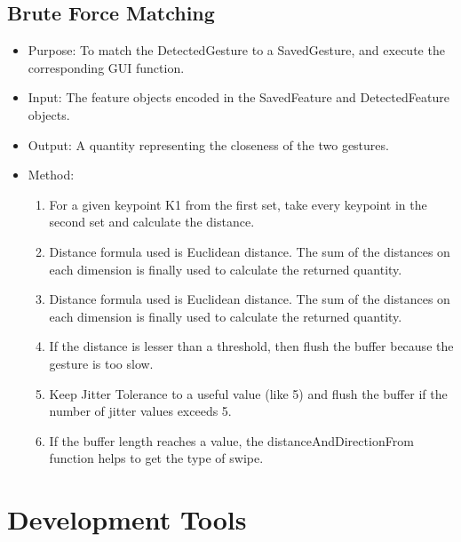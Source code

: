 \documentclass[11pt]{report}
\begin{document}
\subsection{Brute Force Matching}
\begin{itemize}
    \item Purpose: To match the DetectedGesture to a SavedGesture, and execute the corresponding GUI function.
    \item Input: The feature objects encoded in the SavedFeature and DetectedFeature objects.
    \item Output: A quantity representing the closeness of the two gestures.
    \item Method:
    \begin{enumerate}
        \item For a given keypoint K1 from the first set, take every keypoint in the second set and calculate the distance.
        \item Distance formula used is Euclidean distance. The sum of the distances on each dimension is finally used to calculate the returned quantity.
        \item Distance formula used is Euclidean distance. The sum of the distances on
        each dimension is finally used to calculate the returned quantity.
        \item If the distance is lesser than a threshold, then flush the buffer because the gesture is too slow.
        \item Keep Jitter Tolerance to a useful value (like 5) and flush the buffer if the number of jitter values exceeds 5.
        \item If the buffer length reaches a value, the distanceAndDirectionFrom function helps to get the type of swipe.
    \end{enumerate}
\end{itemize}
\section{Development Tools}
\end{document}
